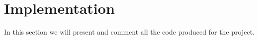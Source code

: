 \section{Implementation}

In this section we will present and comment all the code produced for the project.



